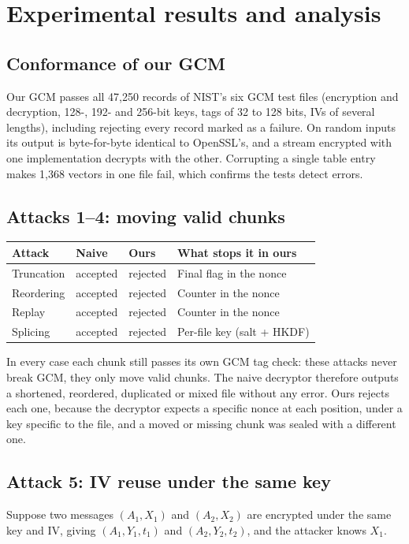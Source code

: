 \documentclass[11pt,a4paper]{article}
\begin{document}
\section{Experimental results and analysis}

\subsection{Conformance of our GCM}
Our GCM passes all 47,250 records of NIST's six GCM test files (encryption and decryption, 128-, 192- and 256-bit keys, tags of 32 to 128 bits, IVs of several lengths), including rejecting every record marked as a failure. On random inputs its output is byte-for-byte identical to OpenSSL's, and a stream encrypted with one implementation decrypts with the other. Corrupting a single table entry makes 1,368 vectors in one file fail, which confirms the tests detect errors.

\subsection{Attacks 1--4: moving valid chunks}
\begin{center}
\begin{tabular}{llll}
\toprule
Attack & Naive & Ours & What stops it in ours\\
\midrule
Truncation & accepted & rejected & Final flag in the nonce\\
Reordering & accepted & rejected & Counter in the nonce\\
Replay & accepted & rejected & Counter in the nonce\\
Splicing & accepted & rejected & Per-file key (salt + HKDF)\\
\bottomrule
\end{tabular}
\end{center}
In every case each chunk still passes its own GCM tag check: these attacks never break GCM, they only move valid chunks. The naive decryptor therefore outputs a shortened, reordered, duplicated or mixed file without any error. Ours rejects each one, because the decryptor expects a specific nonce at each position, under a key specific to the file, and a moved or missing chunk was sealed with a different one.

\subsection{Attack 5: IV reuse under the same key}
Suppose two messages $(A_1, X_1)$ and $(A_2, X_2)$ are encrypted under the same key and IV, giving $(A_1, Y_1, t_1)$ and $(A_2, Y_2, t_2)$, and the attacker knows $X_1$.
\end{document}
